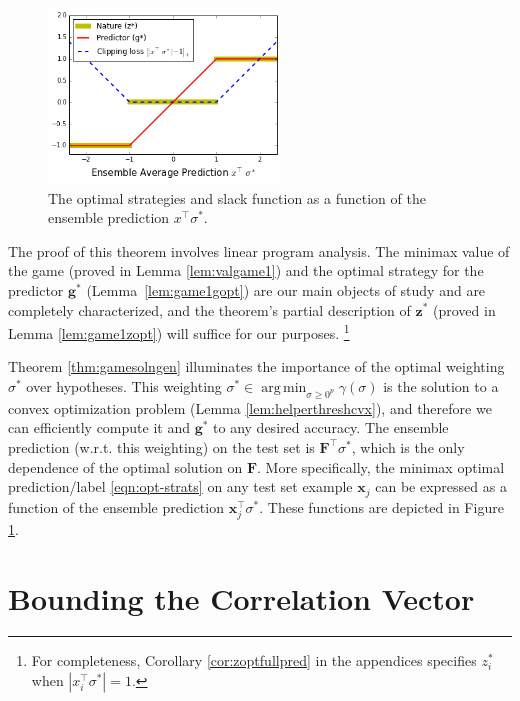 \documentclass{colt2015} %
\newcommand{\vF}{\mathbf{F}}
\newcommand{\vx}{\mathbf{x}}
\newcommand{\vg}{\mathbf{g}}
\newcommand{\vz}{\mathbf{z}}
\DeclareMathOperator*{\argmin}{arg\,min}
\newcommand{\abs}[1]{\left| #1 \right|}
\begin{document}
\begin{figure}
\centering
\includegraphics[width=0.55\textwidth]{figs/optstrats.png}
\caption{
\label{fig:optstrats}
The optimal strategies and slack function as a function of the ensemble prediction $x^\top \sigma^*$.}
\end{figure}

The proof of this theorem involves linear program analysis.
The minimax value of the game (proved in Lemma \ref{lem:valgame1}) and 
the optimal strategy for the predictor $\vg^*$ (Lemma~\ref{lem:game1gopt}) 
are our main objects of study and are completely characterized, 
and the theorem's partial description of $\vz^*$ (proved in Lemma \ref{lem:game1zopt}) 
will suffice for our purposes. 
\footnote{For completeness, Corollary \ref{cor:zoptfullpred} in the appendices 
specifies $z_i^*$ when $\abs{x_{i}^\top \sigma^*} = 1$.}

Theorem \ref{thm:gamesolngen} illuminates the importance of the optimal weighting $\sigma^*$ over hypotheses. 
This weighting $\sigma^* \in \argmin_{\sigma \geq 0^p} \gamma (\sigma)$ is the solution 
to a convex optimization problem (Lemma \ref{lem:helperthreshcvx}), 
and therefore we can efficiently compute it and $\vg^*$ to any desired accuracy. 
The ensemble prediction (w.r.t. this weighting) on the test set is $\vF^\top \sigma^*$, 
which is the only dependence of the optimal solution on $\vF$.
More specifically, the minimax optimal prediction/label \eqref{eqn:opt-strats} on any test set example $\vx_j$ 
can be expressed as a function of the ensemble prediction $\vx_j^\top \sigma^*$.
These functions are depicted in Figure \ref{fig:optstrats}. 



\section{Bounding the Correlation Vector}
\label{sec:uniform-convergence}
\end{document}
